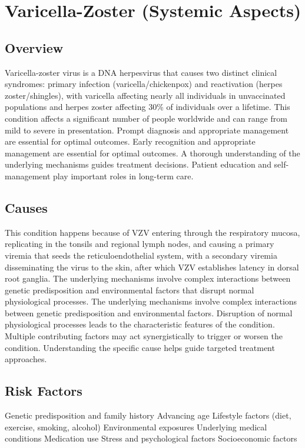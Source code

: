 \chapter{Varicella-Zoster (Systemic Aspects)}
\label{sec:Varicella-Zoster Systemic}

\section{Overview}
Varicella-zoster virus is a DNA herpesvirus that causes two distinct clinical syndromes: primary infection (varicella/chickenpox) and reactivation (herpes zoster/shingles), with varicella affecting nearly all individuals in unvaccinated populations and herpes zoster affecting 30\% of individuals over a lifetime. This condition affects a significant number of people worldwide and can range from mild to severe in presentation. Prompt diagnosis and appropriate management are essential for optimal outcomes. Early recognition and appropriate management are essential for optimal outcomes. A thorough understanding of the underlying mechanisms guides treatment decisions. Patient education and self-management play important roles in long-term care.
\section{Causes}
This condition happens because of VZV entering through the respiratory mucosa, replicating in the tonsils and regional lymph nodes, and causing a primary viremia that seeds the reticuloendothelial system, with a secondary viremia disseminating the virus to the skin, after which VZV establishes latency in dorsal root ganglia. The underlying mechanisms involve complex interactions between genetic predisposition and environmental factors that disrupt normal physiological processes. The underlying mechanisms involve complex interactions between genetic predisposition and environmental factors. Disruption of normal physiological processes leads to the characteristic features of the condition. Multiple contributing factors may act synergistically to trigger or worsen the condition. Understanding the specific cause helps guide targeted treatment approaches.
\section{Risk Factors}
Genetic predisposition and family history Advancing age Lifestyle factors (diet, exercise, smoking, alcohol) Environmental exposures Underlying medical conditions Medication use Stress and psychological factors Socioeconomic factors

